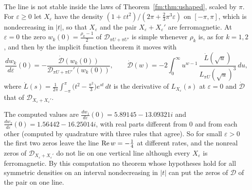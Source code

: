 The line is not stable inside the laws of Theorem~\ref{fm:thm:ushaped}, scaled by $\pi$. For $\varepsilon\ge0$ let $X_\varepsilon$ have the density $(1+\varepsilon t^2)/(2\pi+\frac23\pi^3\varepsilon)$ on $[-\pi,\pi]$, which is nondecreasing in $|t|$, so that $X_\varepsilon$ and the pair $X_\varepsilon+X_\varepsilon'$ are ferromagnetic. At $\varepsilon=0$ the zero $w_k(0)=\frac{\rho_k-1}2$ of $\mathcal D_{\pi U+\pi U'}$ is simple whenever $\rho_k$ is, as for $k=1,2$, and then by the implicit function theorem it moves with
\[
\frac{dw_k}{d\varepsilon}(0)=-\frac{\dot{\mathcal D}(w_k(0))}{\mathcal D_{\pi U+\pi U'}'(w_k(0))},\qquad \dot{\mathcal D}(w)=-2\int_0^\infty u^{w-1}\,\frac{\dot L(\sqrt u)}{L_{\pi U}(\sqrt u)^3}\,du,
\]
where $\dot L(s)=\frac1{2\pi}\int_{-\pi}^\pi\big(t^2-\frac{\pi^2}3\big)e^{st}\,dt$ is the derivative of $L_{X_\varepsilon}(s)$ at $\varepsilon=0$ and $\dot{\mathcal D}$ that of $\mathcal D_{X_\varepsilon+X_\varepsilon'}$.

\begin{resultpar}\label{fm:res:deform}The computed values are $\frac{dw_1}{d\varepsilon}(0)=5.89145-13.09321i$ and $\frac{dw_2}{d\varepsilon}(0)=1.56442-16.25014i$, with real parts different from $0$ and from each other (computed by quadrature with three rules that agree). So for small $\varepsilon>0$ the first two zeros leave the line $\operatorname{Re} w=-\frac14$ at different rates, and the nonreal zeros of $\mathcal D_{X_\varepsilon+X_\varepsilon'}$ do not lie on one vertical line although every $X_\varepsilon$ is ferromagnetic. By this computation no theorem whose hypotheses hold for all symmetric densities on an interval nondecreasing in $|t|$ can put the zeros of $\mathcal D$ of the pair on one line.\end{resultpar}
